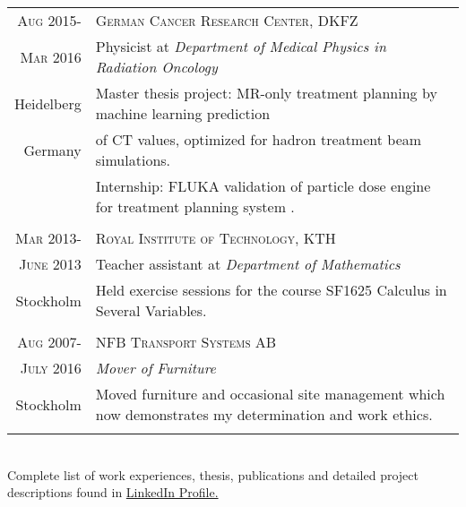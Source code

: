 \documentclass[a4paper,10pt]{article}
\newcommand{\MYhref}[3][blue]{\href{#2}{\color{#1}{#3}}}%
\begin{document}
{\begin{tabular}{r|p{16cm}}

 
 
 
 
 
 
 \textsc{Aug} 2015- & \textsc{German Cancer Research Center, DKFZ} \\
 \textsc{Mar} 2016& Physicist at \emph{Department of Medical Physics in Radiation Oncology}\\
 Heidelberg &\footnotesize{ Master thesis project:  MR-only treatment planning by machine learning prediction } \\
 Germany & \footnotesize{of CT values, optimized for hadron treatment beam simulations.} \\
 & \footnotesize{Internship: FLUKA validation of particle dose engine for treatment planning system \MYhref{ https://aapm.onlinelibrary.wiley.com/doi/abs/10.1002/mp.12251@10.1002/(ISSN)2473-4209.EDITORS_CHOICE}{matRad}.} \\
 \\

 
 \textsc{Mar} 2013- & \textsc{Royal Institute of Technology, KTH}\\
 \textsc{June} 2013 &Teacher assistant at \emph{Department of Mathematics}\\
 Stockholm&\footnotesize{Held exercise sessions for the course SF1625 Calculus in Several Variables. }\\ \\
 
 
 
\textsc{Aug} 2007- & \textsc{NFB Transport Systems AB}\\
 \textsc{July} 2016 & \emph{Mover of Furniture} \\
 
Stockholm & \footnotesize{Moved furniture and occasional site management which now demonstrates my determination and work ethics.} \\
  \\
\end{tabular}
\\
{\setlength\parindent{80pt} { \scriptsize Complete list of work experiences, thesis, publications and detailed project descriptions found in  \href{http://www.linkedin.com/in/danielbjorkman88}{LinkedIn Profile.}} }
 \\
}
\end{document}
